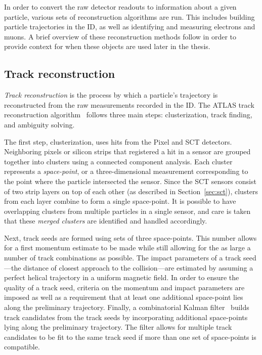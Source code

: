 In order to convert the raw detector readouts to information about a given particle, various sets of reconstruction algorithms are run.
This includes building particle trajectories in the ID, as well as identifying and measuring electrons and muons. %
A brief overview of these reconstruction methods follow in order to provide context for when these objects are used later in the thesis.

\subsection{Track reconstruction}\label{detector:track_reconstruction}
\emph{Track reconstruction} is the process by which a particle's trajectory is reconstructed from the raw measurements recorded in the ID.
The ATLAS track reconstruction algorithm~\cite{2017.atlas-track-reconstruction-run2} follows three main steps: clusterization, track finding, and ambiguity solving.

The first step, clusterization, uses hits from the Pixel and SCT detectors.
Neighboring pixels or silicon strips that registered a hit in a sensor are grouped together into clusters using a connected component analysis.
Each cluster represents a \emph{space-point}, or a three-dimensional measurement corresponding to the point where the particle intersected the sensor.
Since the SCT sensors consist of two strip layers on top of each other (as described in Section~\ref{sec:sct}), clusters from each layer combine to form a single space-point.
It is possible to have overlapping clusters from multiple particles in a single sensor, and care is taken that these \emph{merged clusters} are identified and handled accordingly.

Next, track seeds are formed using sets of three space-points.
This number allows for a first momentum estimate to be made while still allowing for the as large a number of track combinations as possible.
The impact parameters of a track seed---the distance of closest approach to the collision---are estimated by assuming a perfect helical trajectory in a uniform magnetic field.
In order to ensure the quality of a track seed, criteria on the momentum and impact parameters are imposed as well as a requirement that at least one additional space-point lies along the preliminary trajectory.
Finally, a combinatorial Kalman filter~\cite{1987.kalman-filtering} builds track candidates from the track seeds by incorporating additional space-points lying along the preliminary trajectory.
The filter allows for multiple track candidates to be fit to the same track seed if more than one set of space-points is compatible.

